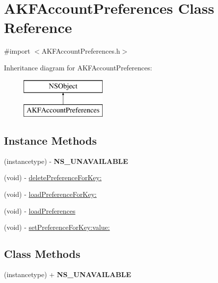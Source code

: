 \hypertarget{interface_a_k_f_account_preferences}{}\section{A\+K\+F\+Account\+Preferences Class Reference}
\label{interface_a_k_f_account_preferences}


{\ttfamily \#import $<$A\+K\+F\+Account\+Preferences.\+h$>$}

Inheritance diagram for A\+K\+F\+Account\+Preferences\+:\begin{figure}[H]
\begin{center}
\leavevmode
\includegraphics[height=2.000000cm]{interface_a_k_f_account_preferences}
\end{center}
\end{figure}
\subsection*{Instance Methods}
\begin{DoxyCompactItemize}
\item 
\hypertarget{interface_a_k_f_account_preferences_a4b659be4bf7aabdca5af94828b8e8d4c}{}(instancetype) -\/ {\bfseries N\+S\+\_\+\+U\+N\+A\+V\+A\+I\+L\+A\+B\+L\+E}\label{interface_a_k_f_account_preferences_a4b659be4bf7aabdca5af94828b8e8d4c}

\item 
(void) -\/ \hyperlink{interface_a_k_f_account_preferences_ae6028184b6b212d654934ece63c16d47}{delete\+Preference\+For\+Key\+:}
\item 
(void) -\/ \hyperlink{interface_a_k_f_account_preferences_a5c108585c8501bd51947dd16ea5cb3b4}{load\+Preference\+For\+Key\+:}
\item 
(void) -\/ \hyperlink{interface_a_k_f_account_preferences_a610d4ad840085e3c46024f1c12a526da}{load\+Preferences}
\item 
(void) -\/ \hyperlink{interface_a_k_f_account_preferences_a3826328a9f2f848dcecc972aed7d1864}{set\+Preference\+For\+Key\+:value\+:}
\end{DoxyCompactItemize}
\subsection*{Class Methods}
\begin{DoxyCompactItemize}
\item 
\hypertarget{interface_a_k_f_account_preferences_a4b659be4bf7aabdca5af94828b8e8d4c}{}(instancetype) + {\bfseries N\+S\+\_\+\+U\+N\+A\+V\+A\+I\+L\+A\+B\+L\+E}\label{interface_a_k_f_account_preferences_a4b659be4bf7aabdca5af94828b8e8d4c}

\end{DoxyCompactItemize}
